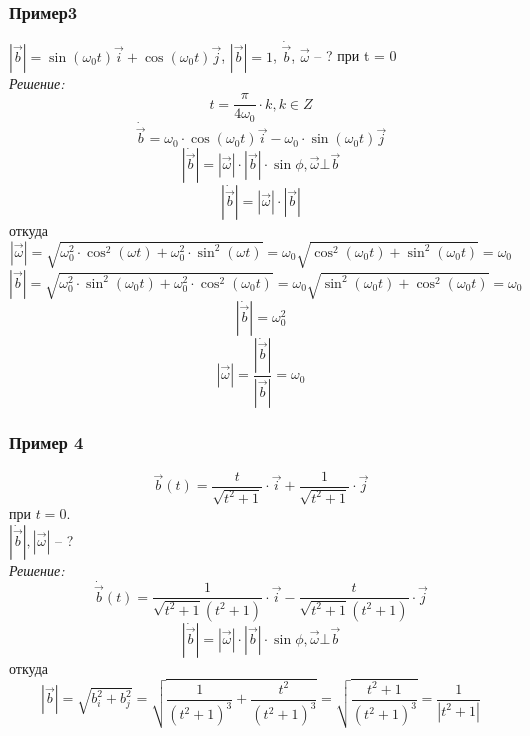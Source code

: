\documentclass{article}
\begin{document}
  \subsubsection*{Пример3}
  $|\vec{b}|=\sin(\omega_{0}t)\vec{i}+\cos(\omega_{0}t)\vec{j}$, $|\vec{b}| = 1$, $\dot{\vec{b}}$, $\vec{\omega}$ -- ? при t = 0\\
  \textit{Решение:}
  $$t = \frac{\pi}{4\omega_{0}}\cdot k, k \in Z$$
  $$\dot{\vec{b}} = \omega_{0}\cdot\cos(\omega_{0}t)\vec{i} - \omega_{0}\cdot\sin(\omega_{0}t)\vec{j}$$
  $$|\dot{\vec{b}}| = |\vec{\omega}|\cdot|\vec{b}|\cdot\sin\phi, \vec{\omega}\bot\vec{b}$$
  $$|\dot{\vec{b}}| = |\vec{\omega}|\cdot|\vec{b}|$$ откуда 
  $$|\vec{\omega}| = \sqrt{\omega_{0}^{2}\cdot \cos^2(\omega t)+\omega_{0}^{2}\cdot \sin^2(\omega t)} = \omega_{0}\sqrt{\cos^2(\omega_0 t)+\sin^2(\omega_0 t)} = \omega_{0}$$
  $$|\vec{b}|=\sqrt{\omega_{0}^2\cdot\sin^2(\omega_{0}t)+\omega_{0}^2\cdot\cos^2(\omega_{0}t)} = \omega_{0}\sqrt{\sin^2(\omega_0 t)+\cos^2(\omega_0 t)} = \omega_{0}$$
  $$|\dot{\vec{b}}| = \omega_{0}^2$$
  $$|\vec{\omega}| = \frac{|\dot{\vec{b}}|}{|\vec{b}|} = \omega_{0}$$
  
  \subsubsection*{Пример 4}
  $$\vec{b}(t) = \frac{t}{\sqrt{t^2+1}}\cdot\vec{i}+\frac{1}{\sqrt{t^2+1}}\cdot\vec{j}$$ при $t = 0$.\\
  $|\dot{\vec{b}}|, |\vec{\omega}|$ -- ? \\
  \textit{Решение:}
  $$\dot{\vec{b}}(t) = \frac{1}{\sqrt{t^2+1}(t^2+1)}\cdot\vec{i}-\frac{t}{\sqrt{t^2+1}(t^2+1)}\cdot\vec{j}$$
  $$|\dot{\vec{b}}| = |\vec{\omega}|\cdot|\vec{b}|\cdot\sin\phi, \vec{\omega}\bot\vec{b}$$
  откуда
  $$|\vec{b}| = \sqrt{b_{i}^2+b_{j}^2} = \sqrt{\frac{1}{(t^2+1)^3}+\frac{t^2}{(t^2+1)^3}}=\sqrt{\frac{t^2+1}{(t^2+1)^3}}=\frac{1}{|t^2+1|}$$
\end{document}
